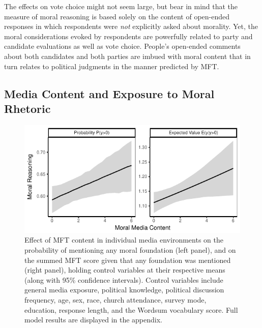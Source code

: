 \documentclass[12pt]{article}
\begin{document}
The effects on vote choice might not seem large, but bear in mind that the measure of moral reasoning is based solely on the content of open-ended responses in which respondents were \textit{not} explicitly asked about morality. Yet, the moral considerations evoked by respondents are powerfully related to party and candidate evaluations as well as vote choice. People's open-ended comments about both candidates and both parties are imbued with moral content that in turn relates to political judgments in the manner predicted by MFT.


\subsection*{Media Content and Exposure to Moral Rhetoric}

\begin{figure}[h]\centering
\includegraphics{../calc/fig/tobit_media.pdf}
\caption{Effect of MFT content in individual media environments on the probability of mentioning any moral foundation (left panel), and on the summed MFT score given that any foundation was mentioned (right panel), holding control variables at their respective means (along with 95\% confidence intervals). Control variables include general media exposure, political knowledge, political discussion frequency, age, sex, race, church attendance, survey mode, education, response length, and the Wordsum vocabulary score. Full model results are displayed in the appendix.
}\label{fig:tobit_media}
\end{figure}
\end{document}
